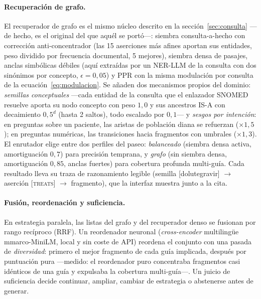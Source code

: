 \documentclass[11pt,a4paper]{article}
\begin{document}
\paragraph{Recuperación de grafo.}
El recuperador de grafo es el mismo núcleo descrito en la
sección~\ref{sec:consulta} ---de hecho, es el original del que aquél se
portó---: siembra consulta-a-hecho con corrección anti-concentrador
(las 15 aserciones más afines aportan sus entidades, peso dividido por
frecuencia documental, 5 mejores), siembra densa de pasajes, anclas
simbólicas débiles (aquí extraídas por un NER-LLM de la consulta con dos
sinónimos por concepto, $\epsilon=0{,}05$) y PPR con la misma modulación
por consulta de la ecuación~\eqref{eq:modulacion}. Se añaden dos mecanismos
propios del dominio: \emph{semillas conceptuales} ---cada entidad de la
consulta que el enlazador SNOMED resuelve aporta su nodo concepto con peso
$1{,}0$ y sus ancestros IS-A con decaimiento $0{,}5^{d}$ (hasta 2 saltos),
todo escalado por $0{,}1$--- y \emph{sesgos por intención}: en preguntas
sobre un paciente, las aristas de población diana se refuerzan
($\times 1{,}5$); en preguntas numéricas, las transiciones hacia fragmentos
con umbrales ($\times 1{,}3$). El enrutador elige entre dos perfiles del
paseo: \emph{balanceado} (siembra densa activa, amortiguación $0{,}7$)
para precisión temprana, y \emph{grafo} (sin siembra densa, amortiguación
$0{,}85$, anclas fuertes) para cobertura profunda multi-guía. Cada
resultado lleva su traza de razonamiento legible
(\guillemotleft{}semilla [dolutegravir] $\to$ aserción [\textsc{treats}] $\to$
fragmento\guillemotright{}), que la interfaz muestra junto a la cita.

\paragraph{Fusión, reordenación y suficiencia.}
En estrategia paralela, las listas del grafo y del recuperador denso se
fusionan por rango recíproco (RRF). Un reordenador neuronal
(\emph{cross-encoder} multilingüe mmarco-MiniLM, local y sin coste de API)
reordena el conjunto con una pasada de \emph{diversidad}: primero el mejor
fragmento de cada guía implicada, después por puntuación pura ---medido:
el reordenador puro concentraba fragmentos casi idénticos de una guía y
expulsaba la cobertura multi-guía---. Un juicio de suficiencia decide
continuar, ampliar, cambiar de estrategia o abstenerse antes de generar.
\end{document}
